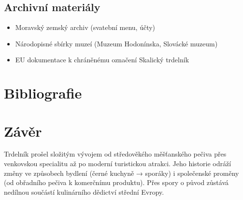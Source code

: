 \documentclass[a5paper,10pt]{book}
\begin{document}
\section{Archivní materiály}
\begin{itemize}
\item Moravský zemský archiv (svatební menu, účty)
\item Národopisné sbírky muzeí (Muzeum Hodonínska, Slovácké muzeum)
\item EU dokumentace k chráněnému označení Skalický trdelník
\end{itemize}

\chapter{Bibliografie}



\chapter{Závěr}

Trdelník prošel složitým vývojem od středověkého měšťanského pečiva přes venkovskou specialitu až po moderní turistickou atrakci. Jeho historie odráží změny ve způsobech bydlení (černé kuchyně → sporáky) i společenské proměny (od obřadního pečiva k komerčnímu produktu). Přes spory o původ zůstává nedílnou součástí kulinárního dědictví střední Evropy.

  
\end{document}
